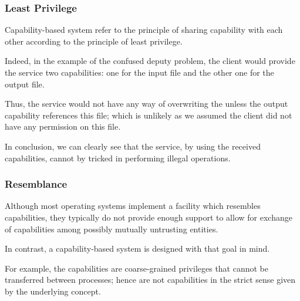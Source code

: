 
\begin{frame}
  \frametitle{Least Privilege}

  Capability-based system refer to the principle of sharing capability with
  each other according to the principle of least privilege.

  \-

  Indeed, in the example of the confused deputy problem, the client would
  provide the service two capabilities: one for the input file and the other
  one for the output file.

  \-

  Thus, the service would not have any way of overwriting the
   unless the output capability references this file;
  which is unlikely as we assumed the client did not have any permission
  on this file.

  \-

  In conclusion, we can clearly see that the service, by using the received
  capabilities, cannot by tricked in performing illegal operations.
\end{frame}


\begin{frame}
  \frametitle{Resemblance}

  Although most operating systems implement a facility which resembles
  capabilities, they typically do not provide enough support to allow
  for exchange of capabilities among possibly mutually untrusting entities.

  \-

  In contrast, a capability-based system is designed with that goal in mind.

  \-

  For example, the  capabilities are coarse-grained
  privileges that cannot be transferred between processes; hence are not
  capabilities in the strict sense given by the underlying concept.
\end{frame}


